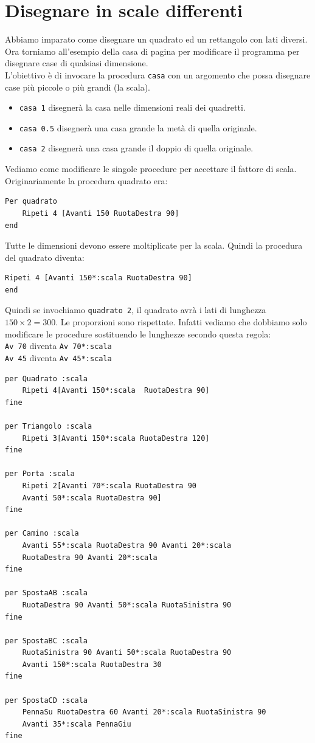 \section{Disegnare in scale differenti}
Abbiamo imparato come disegnare un quadrato ed un rettangolo con lati diversi. Ora torniamo all'esempio della casa di pagina \pageref{maison} per modificare il programma per disegnare case di qualsiasi dimensione. \\
L'obiettivo è di invocare la procedura \texttt{casa} con un argomento che possa disegnare case più piccole o più grandi (la scala).
\begin{itemize}
	\item \texttt{casa 1} disegnerà la casa nelle dimensioni reali dei quadretti.
	\item \texttt{casa 0.5} disegnerà una casa grande la metà di quella originale.
	\item \texttt{casa 2} disegnerà una casa grande il doppio di quella originale.
\end{itemize}

Vediamo come modificare le singole procedure per accettare il fattore di scala. Originariamente la procedura quadrato era:
\begin{lstlisting}
Per quadrato
	Ripeti 4 [Avanti 150 RuotaDestra 90]
end
\end{lstlisting}

Tutte le dimensioni devono essere moltiplicate per la scala. Quindi la procedura del quadrato diventa:
\begin{lstlisting}[caption="Disegnare un quadrato in scala"]
	Ripeti 4 [Avanti 150*:scala RuotaDestra 90]
end
\end{lstlisting}

Quindi se invochiamo \texttt{quadrato 2}, il quadrato avrà i lati di lunghezza $150\times2=300$. Le proporzioni sono rispettate. Infatti vediamo che dobbiamo solo modificare le procedure sostituendo le lunghezze secondo questa regola:\\
\texttt{Av 70} diventa \texttt{Av 70*:scala} \\
\texttt{Av 45} diventa \texttt{Av 45*:scala} \\ 

\begin{lstlisting}[caption="Il disegno della casa in scala"]
per Quadrato :scala
	Ripeti 4[Avanti 150*:scala  RuotaDestra 90]
fine

per Triangolo :scala
	Ripeti 3[Avanti 150*:scala RuotaDestra 120]
fine

per Porta :scala
	Ripeti 2[Avanti 70*:scala RuotaDestra 90 
	Avanti 50*:scala RuotaDestra 90]
fine

per Camino :scala
	Avanti 55*:scala RuotaDestra 90 Avanti 20*:scala 
	RuotaDestra 90 Avanti 20*:scala
fine

per SpostaAB :scala
	RuotaDestra 90 Avanti 50*:scala RuotaSinistra 90
fine

per SpostaBC :scala
	RuotaSinistra 90 Avanti 50*:scala RuotaDestra 90 
	Avanti 150*:scala RuotaDestra 30
fine

per SpostaCD :scala
	PennaSu RuotaDestra 60 Avanti 20*:scala RuotaSinistra 90 
	Avanti 35*:scala PennaGiu
fine
\end{lstlisting}


